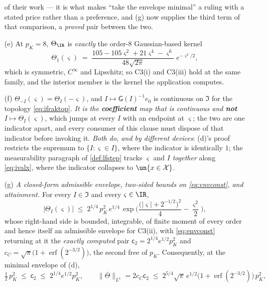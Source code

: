 \begin{lemma}
\begin{enumerate}
of their work --- it is what makes ``take the envelope minimal'' a ruling with a stated price rather than
a preference, and \textup{(g)} now supplies the third term of that comparison, a \emph{proved} pair
between the two.
\item[(e)] At $p_K=8$, $\Theta_{\IR}$ is \emph{exactly} the order-$8$ Gaussian-based kernel
\[
\Theta_1(\varsigma)\;=\;\frac{105-105\varsigma^{2}+21\varsigma^{4}-\varsigma^{6}}{48\sqrt{2\pi}}\;e^{-\varsigma^{2}/2} ,
\]
which is symmetric, $C^\infty$ and Lipschitz; so C3(i) and C3(iii) hold at the same family, and the
interior member is the kernel the application computes.
\item[(f)] $\Theta_{-I}(\varsigma)=\Theta_I(-\varsigma)$, and $I\mapsto\mathsf G(I)^{-1}e_0$ is
continuous on $\mathfrak I$ for the topology \eqref{eq:ifraktop}. \emph{It is the \textbf{coefficient}
map that is continuous and \textbf{not} $I\mapsto\Theta_I(\varsigma)$}, which jumps at every $I$ with an
endpoint at $\varsigma$; the two are one indicator apart, and every consumer of this clause must dispose
of that indicator before invoking it. \emph{Both do, and by different devices}: \textup{(d)}'s proof
restricts the supremum to $\{I:\varsigma\in I\}$, where the indicator is identically $1$; the
measurability paragraph of \cref{def:lfstep} tracks $\varsigma$ and $I$ \emph{together} along
\eqref{eq:ivalx}, where the indicator collapses to $\un\{x\in\mathcal X\}$.
\item[(g)] \emph{A closed-form admissible envelope, two-sided bounds on \eqref{eq:envconst}, and
attainment.} For every $I\in\mathfrak I$ and every $\varsigma\in\IR$,
\begin{equation}\label{eq:envsharp}
\big|\Theta_I(\varsigma)\big|
\;\le\;
2^{1/4}\,p_K^{2}\,e^{1/4}\,
\exp\Big(\frac{\big(|\varsigma|+2^{-1/2}\big)^{2}}{4}-\frac{\varsigma^{2}}{2}\Big) ,
\end{equation}
whose right-hand side is bounded, integrable, of finite moment of every order and hence itself an
admissible envelope for C3(ii), with \eqref{eq:envconst} returning at it the \emph{exactly computed}
pair $\mathsf c_2=2^{1/4}e^{1/2}p_K^{2}$ and $c_C=\sqrt\pi\big(1+\operatorname{erf}(2^{-3/2})\big)$,
the second free of $p_K$. Consequently, at the minimal envelope of \textup{(d)},
\begin{equation}\label{eq:envbnds}
\tfrac12\,p_K^{2}\;\le\;\mathsf c_2\;\le\;2^{1/4}e^{1/2}p_K^{2} ,
\qquad
\|\bar\Theta\|_{L^{1}}=2c_C\mathsf c_2\;\le\;2^{5/4}\sqrt\pi\,e^{1/2}\big(1+\operatorname{erf}(2^{-3/2})\big)\,p_K^{2} ,
\end{equation}

\end{enumerate}
\end{lemma}
